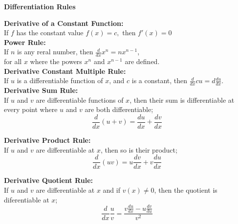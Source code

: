 \documentclass{report}
\newenvironment{information}[1][Cerulean]
  {\begin{tcolorbox}[colframe=#1,colback=white]}
  {\end{tcolorbox}}
\begin{document}
\begin{information}
\textcolor{Cerulean}{
    \begin{center}
        \textbf{Differentiation Rules}\\
    \end{center}}
    \textcolor{Cerulean}{\textbf{Derivative of a Constant Function:}\\
    If $f$ has the constant value $f(x) = c,$ then $f'(x) = 0$}\\

    \textcolor{Cerulean}{\textbf{Power Rule:}\\
    If $n$ is any reral number, then $\frac{d}{dx} x^n = nx^{n-1}$,\\
    for all $x$ where the powers $x^n$ and $x^{n-1}$ are defined.}\\

    \textcolor{Cerulean}{\textbf{Derivative Constant Multiple Rule:}\\
    If $u$ is a differentiable function of $x$, and $c$ is a constant, then $\frac{d}{dx} cu = d \frac{du}{dx}$.}\\

    \textcolor{Cerulean}{\textbf{Derivative Sum Rule:}\\
    If $u$ and $v$ are differentiable functions of $x$, then their sum is differentiable at every point where $u$ and $v$ are both differentiable;
    \begin{equation}
        \frac{d}{dx}(u+v) = \frac{du}{dx} + \frac{dv}{dx}
    \end{equation}}

    \textcolor{Cerulean}{\textbf{Derivative Product Rule:}\\
    If $u$ and $v$ are differentiable at $x$, then so is their product;
    \begin{equation}
        \frac{d}{dx} (uv) = u\frac{dv}{dx} + v\frac{du}{dx}
    \end{equation}}

    \textcolor{Cerulean}{\textbf{Derivative Quotient Rule:}\\
    If $u$ and $v$ are differentiable at $x$ and if $v(x) \neq 0$, then the quotient is diferentiable at $x$;
    \begin{equation}
        \frac{d}{dx}\frac{u}{v} = \frac{v\frac{du}{dx} - u\frac{dv}{du}}{v^2}
    \end{equation}}
\end{information}
\end{document}
